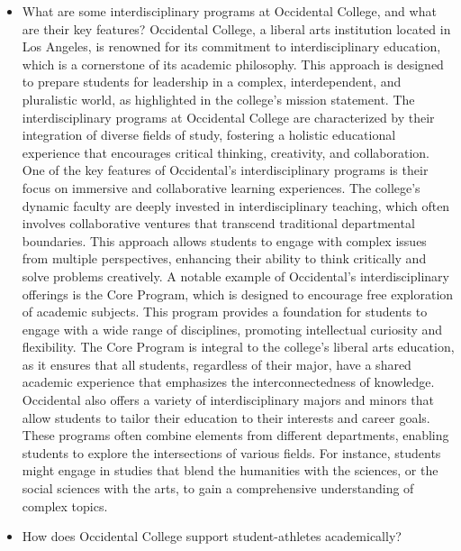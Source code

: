\documentclass[10pt,twocolumn]{article}
\begin{document}
\begin{itemize}
\item What are some interdisciplinary programs at Occidental College, and what are their key features? Occidental College, a liberal arts institution located in Los Angeles, is renowned for its commitment to interdisciplinary education, which is a cornerstone of its academic philosophy. This approach is designed to prepare students for leadership in a complex, interdependent, and pluralistic world, as highlighted in the college's mission statement. The interdisciplinary programs at Occidental College are characterized by their integration of diverse fields of study, fostering a holistic educational experience that encourages critical thinking, creativity, and collaboration. One of the key features of Occidental's interdisciplinary programs is their focus on immersive and collaborative learning experiences. The college's dynamic faculty are deeply invested in interdisciplinary teaching, which often involves collaborative ventures that transcend traditional departmental boundaries. This approach allows students to engage with complex issues from multiple perspectives, enhancing their ability to think critically and solve problems creatively. A notable example of Occidental's interdisciplinary offerings is the Core Program, which is designed to encourage free exploration of academic subjects. This program provides a foundation for students to engage with a wide range of disciplines, promoting intellectual curiosity and flexibility. The Core Program is integral to the college's liberal arts education, as it ensures that all students, regardless of their major, have a shared academic experience that emphasizes the interconnectedness of knowledge.
Occidental also offers a variety of interdisciplinary majors and minors that allow students to tailor their education to their interests and career goals. These programs often combine elements from different departments, enabling students to explore the intersections of various fields. For instance, students might engage in studies that blend the humanities with the sciences, or the social sciences with the arts, to gain a comprehensive understanding of complex topics. 

\item How does Occidental College support student-athletes academically?


\end{itemize}
\end{document}
